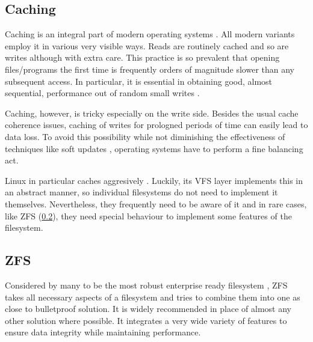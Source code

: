         \subsection{Caching}


            Caching is an integral part of modern operating systems
            \cite{IO_bottleneck?}. All modern variants employ it in various
            very visible ways. Reads are routinely cached and so are writes
            although with extra care. This practice is so prevalent that
            opening files/programs the first time is frequently orders of
            magnitude slower than any subsequent access. In particular, it is
            essential in obtaining good, almost sequential, performance out of
            random small writes \cite{soft_updates}.

            Caching, however, is tricky especially on the write side. Besides
            the usual cache coherence issues, caching of writes for prologned
            periods of time can easily lead to data loss. To avoid this
            possibility while not diminishing the effectiveness of techniques
            like soft updates \cite{soft_updates}, operating systems have to
            perform a fine balancing act.

            Linux in particular caches aggresively \cite{its docs?}. Luckily,
            its VFS layer implements this in an abstract manner, so individual
            filesystems do not need to implement it themselves. Nevertheless,
            they frequently need to be aware of it and in rare cases, like ZFS
            (\ref{ZFS}), they need special behaviour to implement some features
            of the filesystem.

        \subsection{ZFS}
            \label{ZFS}

            Considered by many to be the most robust enterprise ready
            filesystem \cite{pls you have to}, ZFS takes all necessary aspects
            of a filesystem and tries to combine them into one as close to
            bulletproof solution. It is widely recommended in place of almost
            any other solution where possible. It integrates a very wide
            variety of features to ensure data integrity while maintaining
            performance.

